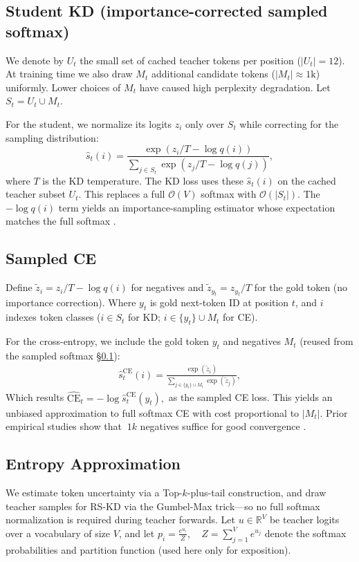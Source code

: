 \documentclass[11pt]{article}
\begin{document}
\subsection{Student KD (importance-corrected sampled softmax)}
\label{sec:sampled_softmax}
We denote by $U_t$ the small set of cached teacher tokens per position ($|U_t|=12$).
At training time we also draw $M_t$ additional candidate tokens ($|M_t| \approx 1\text{k}$) uniformly.
Lower choices of $M_t$ have caused high perplexity degradation.
Let $S_t = U_t \cup M_t$.

For the student, we normalize its logits $z_i$ only over $S_t$ while correcting for the sampling distribution:
\[
	\hat s_t(i) = \frac{\exp(z_i/T - \log q(i))}{\sum_{j \in S_t} \exp(z_j/T - \log q(j))},
\]
where $T$ is the KD temperature.
The KD loss uses these $\hat s_t(i)$ on the cached teacher subset $U_t$. This replaces a full $\mathcal{O}(V)$ softmax with $\mathcal{O}(|S_t|)$.
The $-\log q(i)$ term yields an importance-sampling estimator whose expectation matches the full softmax \citep{jean2015large}.

\subsection{Sampled CE}
Define $\tilde z_i = z_i/T - \log q(i)$ for negatives and $\tilde z_{y_t}=z_{y_t}/T$ for the gold token (no importance correction).
Where $y_t$ is gold next-token ID at position $t$, and $i$ indexes token classes ($i\in S_t$ for KD; $i\in\{y_t\}\cup M_t$ for CE).

For the cross-entropy, we include the gold token $y_t$ and negatives $M_t$ (reused from the sampled softmax \S\ref{sec:sampled_softmax}):
\begin{align*}
	\hat s^{\text{CE}}_t(i) = \frac{\exp(\tilde z_i)}{\sum_{j \in \{y_t\}\cup M_t} \exp(\tilde z_j)},
\end{align*}
Which results
\(
\widehat{\text{CE}}_t = -\log \hat s^{\text{CE}}_t(y_t),
\)
as the sampled CE loss.
This yields an unbiased approximation to full softmax CE with cost proportional to $|M_t|$.
Prior empirical studies show that $~1k$ negatives suffice for good convergence \citep{blanc2018adaptive}.

\subsection{Entropy Approximation}
\label{sec:entropy}
We estimate token uncertainty via a Top-$k$-plus-tail construction, and draw teacher samples for RS-KD via the Gumbel-Max trick---so no full softmax normalization is required during teacher forwards.
Let $u \in \mathbb{R}^V$ be teacher logits over a vocabulary of size $V$, and let
$
	p_i=\frac{e^{u_i}}{Z},\quad Z=\sum_{j=1}^V e^{u_j}
$
denote the softmax probabilities and partition function (used here only for exposition).
\end{document}
